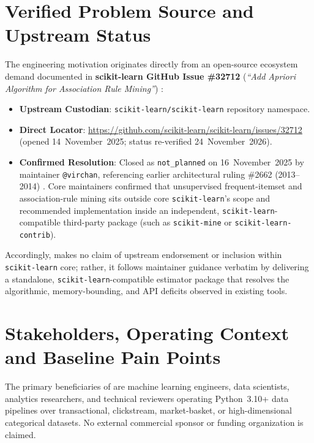 \section{Verified Problem Source and Upstream Status}
The engineering motivation originates directly from an open-source ecosystem demand documented in \textbf{scikit-learn GitHub Issue \#32712} (\emph{``Add Apriori Algorithm for Association Rule Mining''}) \cite{sklearn32712}:
\begin{itemize}
  \item \textbf{Upstream Custodian}: \texttt{scikit-learn/\protect\allowbreak{}scikit-learn} repository namespace.
  \item \textbf{Direct Locator}: \url{https://github.com/scikit-learn/scikit-learn/issues/32712} (opened 14~November~2025; status re-verified 24~November~2026).
  \item \textbf{Confirmed Resolution}: Closed as \texttt{not\_\protect\allowbreak{}planned} on 16~November~2025 by maintainer \texttt{@virchan}, referencing earlier architectural ruling \#2662 (2013--2014) \cite{sklearn2662}. Core maintainers confirmed that unsupervised frequent-itemset and association-rule mining sits outside core \texttt{scikit-learn}'s scope and recommended implementation inside an independent, \texttt{scikit-learn}-compatible third-party package (such as \texttt{scikit-mine} or \texttt{scikit-learn-contrib}).
\end{itemize}

Accordingly, \skarm makes no claim of upstream endorsement or inclusion within \texttt{scikit-learn} core; rather, it follows maintainer guidance verbatim by delivering a standalone, \texttt{scikit-learn}-compatible estimator package that resolves the algorithmic, memory-bounding, and API deficits observed in existing tools.

\section{Stakeholders, Operating Context and Baseline Pain Points}
The primary beneficiaries of \skarm are machine learning engineers, data scientists, analytics researchers, and technical reviewers operating Python~3.10+ data pipelines over transactional, clickstream, market-basket, or high-dimensional categorical datasets. No external commercial sponsor or funding organization is claimed.

